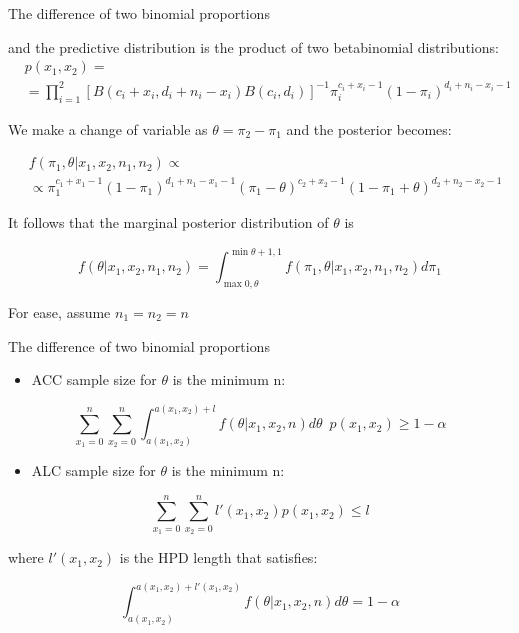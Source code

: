 \documentclass{beamer}
\begin{document}
\begin{frame}{The difference of two binomial proportions}

and the predictive distribution is the product of two betabinomial
distributions: 
\begin{align}
& p\left(x_{1},x_{2}\right)=\\
&=\prod_{i=1}^2 {\left[B\left(c_{i}+x_{i},d_{i}+n_{i}-x_{i}\right)B\left(c_{i},d_{i}\right)\right]^{-1}\pi_{i}^{c_{i}+x_{i}-1}\left(1-\pi_{i}\right)^{d_{i}+n_{i}-x_{i}-1} }
\end{align}



We make a change of variable as \(\theta=\pi_{2}-\pi_{1}\) and the
posterior becomes:


\begin{align}
& f\left(\pi_{1},\theta\vert x_{1},x_{2},n_{1},n_{2}\right)\propto \\
& \propto \pi_{1}^{c_{1}+x_{1}-1}\left(1-\pi_{1}\right)^{d_{1}+n_{1}-x_{1}-1} \left(\pi_{1}-\theta\right)^{c_{2}+x_{2}-1}\left(1-\pi_{1}+\theta\right)^{d_{2}+n_{2}-x_{2}-1}
\end{align}


It follows that the marginal posterior distribution of \(\theta\) is

\[
f\left(\theta\vert x_{1},x_{2},n_{1},n_{2}\right)=\int_{\max{0,\theta}}^{\min{\theta+1,1}} f\left(\pi_{1},\theta\vert x_{1},x_{2},n_{1},n_{2}\right) d\pi_{1}
\]

For ease, assume \(n_{1}=n_{2}=n\)

\end{frame}


\begin{frame}{The difference of two binomial proportions}

\begin{itemize}
\itemsep1pt\parskip0pt
\item
  ACC sample size for \(\theta\) is the minimum n:
\end{itemize}

\[
\sum_{x_{1}=0}^{n} \sum_{x_{2}=0}^{n} \int_{a\left(x_{1},x_{2}\right)}^{a\left(x_{1},x_{2}\right)+l} f\left(\theta\vert x_{1},x_{2},n\right)d\theta\phantom{0}p\left(x_{1},x_{2}\right) \ge 1-\alpha 
\]

\begin{itemize}
\itemsep1pt\parskip0pt
\item
  ALC sample size for \(\theta\) is the minimum n:
\end{itemize}

\[
\sum_{x_{1}=0}^{n} \sum_{x_{2}=0}^{n} l'\left(x_{1},x_{2}\right) p\left(x_{1},x_{2}\right) \le l 
\]

where \(l'\left(x_{1},x_{2}\right)\) is the HPD length that satisfies:

\[
\int_{a\left(x_{1},x_{2}\right)}^{a\left(x_{1},x_{2}\right)+l'\left(x_{1},x_{2}\right)} f\left(\theta\vert x_{1},x_{2},n\right)d\theta =1-\alpha
\]

\end{frame}
\end{document}
